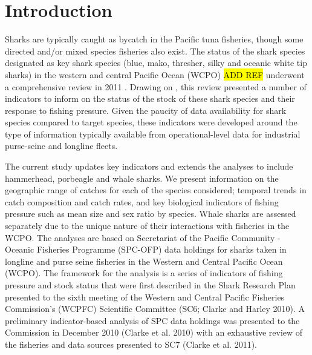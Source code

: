 \documentclass[12pt]{SCreport}
\begin{document}
 \wcpfctitlepage

\tableofcontents


\section{Introduction} %


 
Sharks are typically caught as bycatch in the Pacific tuna fisheries, though some directed and/or mixed species fisheries also exist. The status of the shark species designated as key shark species (blue, mako, thresher, silky and oceanic white tip sharks) in the western and central Pacific Ocean (WCPO) \hl{ADD REF} underwent a comprehensive review in 2011 \citep{Clarke2011_a}. Drawing on \citep{...}, this review presented a number of indicators to inform on the status of the stock of these shark species and their response to fishing pressure. Given the paucity of data availability for shark species compared to target species, these indicators were developed around the type of information typically available from operational-level data for industrial purse-seine and longline fleets. 

The current study updates key indicators and extends the analyses to include hammerhead, porbeagle and whale sharks. We present information on the geographic range of catches for each of the species considered; temporal trends in catch composition and catch rates, and key biological indicators of fishing pressure such as mean size and sex ratio by species. Whale sharks are assessed separately due to the unique nature of their interactions with fisheries in the WCPO. The analyses are based on Secretariat of the Pacific Community - Oceanic Fisheries Programme (SPC-OFP) data holdings for sharks taken in longline and purse seine fisheries in the Western and Central Pacific Ocean (WCPO). The framework for the analysis is a series of indicators of fishing pressure and stock status that were first described in the Shark Research Plan presented to the sixth meeting of the Western and Central Pacific Fisheries Commission's (WCPFC) Scientific Committee (SC6; Clarke and Harley 2010). A preliminary indicator-based analysis of SPC data holdings was presented to the Commission in December 2010 (Clarke et al. 2010) with an exhaustive review of the fisheries and data sources presented to SC7 (Clarke et al. 2011). 
\end{document}
